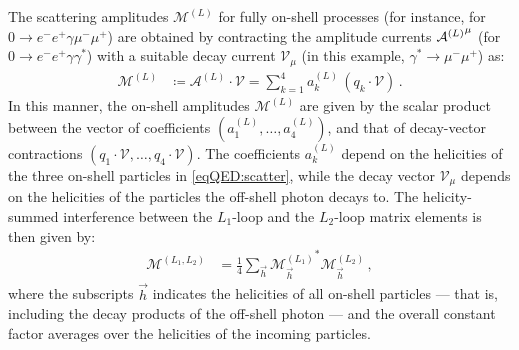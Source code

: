 \documentclass[main.tex]{subfiles}
\begin{document}
\smallskip

The scattering amplitudes $\mathcal{M}^{(L)}$ for fully on-shell processes (for instance, for $0 \to e^-e^+ \gamma \mu^-\mu^+$) are obtained by contracting the amplitude currents ${\mathcal{A}^{(L)}}^{\mu}$ (for $0 \to e^-e^+ \gamma \gamma^*$) with a suitable decay current $\mathcal{V}_\mu$ (in this example, $\gamma^*\to\mu^-\mu^+$) as:
\begin{align}
    \label{eqQED:on-shell-amps}
    \mathcal{M}^{(L)} &\coloneqq \mathcal{A}^{(L)} \cdot\mathcal{V}  = \sum_{k=1}^4 a_k^{(L)} \, \left( q_k\cdot\mathcal{V} \right) \,.
\end{align}
In this manner, the on-shell amplitudes $\mathcal{M}^{(L)}$ are given by the scalar product between the vector of coefficients $(a_1^{(L)}, \ldots, a_4^{(L)})$, and that of decay-vector contractions $(q_1\cdot\mathcal{V}, \ldots, q_4\cdot\mathcal{V} )$.
The coefficients $a^{(L)}_k$ depend on the helicities of the three on-shell particles in \cref{eqQED:scatter}, while the decay vector $\mathcal{V}_{\mu}$ depends on the helicities of the particles the off-shell photon decays to. The helicity-summed interference between the $L_1$-loop and the $L_2$-loop matrix elements is then given by:
\begin{align} \label{eqQED:squared_M}
    \mathcal{M}^{(L_1,L_2)} &= \frac{1}{4} \sum_{\vec{h}} {\mathcal{M}^{(L_1)}_{\vec{h}}}^* \mathcal{M}^{(L_2)}_{\vec{h}} \,,
\end{align}
where the subscripts $\vec{h}$ indicates the helicities of all on-shell particles --- that is, including the decay products of the off-shell photon --- and the overall constant factor averages over the helicities of the incoming particles.

\smallskip
\end{document}
